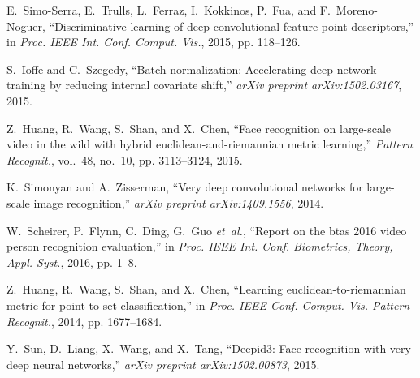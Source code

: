 \documentclass[10pt,journal,cspaper,compsoc]{IEEEtran}
\begin{document}
\begin{thebibliography}{10}
E.~Simo-Serra, E.~Trulls, L.~Ferraz, I.~Kokkinos, P.~Fua, and F.~Moreno-Noguer,
  ``Discriminative learning of deep convolutional feature point descriptors,''
  in \emph{Proc. IEEE Int. Conf. Comput. Vis.}, 2015, pp. 118--126.

S.~Ioffe and C.~Szegedy, ``Batch normalization: Accelerating deep network
  training by reducing internal covariate shift,'' \emph{arXiv preprint
  arXiv:1502.03167}, 2015.

Z.~Huang, R.~Wang, S.~Shan, and X.~Chen, ``Face recognition on large-scale
  video in the wild with hybrid euclidean-and-riemannian metric learning,''
  \emph{Pattern Recognit.}, vol.~48, no.~10, pp. 3113--3124, 2015.

K.~Simonyan and A.~Zisserman, ``Very deep convolutional networks for
  large-scale image recognition,'' \emph{arXiv preprint arXiv:1409.1556}, 2014.

W.~Scheirer, P.~Flynn, C.~Ding, G.~Guo \emph{et~al.}, ``Report on the btas 2016
  video person recognition evaluation,'' in \emph{Proc. IEEE Int. Conf.
  Biometrics, Theory, Appl. Syst.}, 2016, pp. 1--8.

Z.~Huang, R.~Wang, S.~Shan, and X.~Chen, ``Learning euclidean-to-riemannian
  metric for point-to-set classification,'' in \emph{Proc. IEEE Conf. Comput.
  Vis. Pattern Recognit.}, 2014, pp. 1677--1684.

Y.~Sun, D.~Liang, X.~Wang, and X.~Tang, ``Deepid3: Face recognition with very
  deep neural networks,'' \emph{arXiv preprint arXiv:1502.00873}, 2015.

\end{thebibliography}
\end{document}
